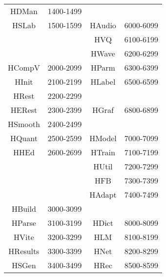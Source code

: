 \begin{itemize}
\begin{center}
\begin{tabular}{|c|c|c|c|}
HDMan    & 1400-1499     &               &              \\


HSLab    & 1500-1599     & HAudio        & 6000-6099    \\


         &               & HVQ           & 6100-6199    \\


         &               & HWave         & 6200-6299    \\


HCompV   & 2000-2099     & HParm         & 6300-6399    \\


HInit    & 2100-2199     & HLabel        & 6500-6599    \\


HRest    & 2200-2299     &               &              \\


HERest   & 2300-2399     & HGraf         & 6800-6899    \\


HSmooth  & 2400-2499     &               &              \\


HQuant   & 2500-2599     & HModel        & 7000-7099    \\


HHEd     & 2600-2699     & HTrain        & 7100-7199    \\


         &               & HUtil         & 7200-7299    \\


         &               & HFB           & 7300-7399    \\


         &               & HAdapt        & 7400-7499    \\


HBuild   & 3000-3099     &               &              \\


HParse   & 3100-3199     & HDict         & 8000-8099    \\


HVite    & 3200-3299     & HLM           & 8100-8199    \\


HResults & 3300-3399     & HNet          & 8200-8299    \\


HSGen    & 3400-3499     & HRec          & 8500-8599    \\



\end{tabular}
\end{center}
\end{itemize}
